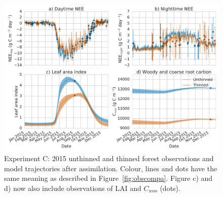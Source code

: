 \documentclass[draft,linenumbers]{agujournal}
\begin{document}
 \begin{figure}[ht]
    \centering
        \includegraphics[width=\textwidth]{obs_compc.pdf}
\caption{Experiment C: 2015 unthinned and thinned forest observations and model trajectories after assimilation. Colour, lines and dots have the same meaning as described in Figure~\ref{fig:obscompa}. Figure c) and d) now also include observations of LAI and \(C_{woo}\) (dots).}
 \label{fig:obscompc}
 \end{figure}
\end{document}
